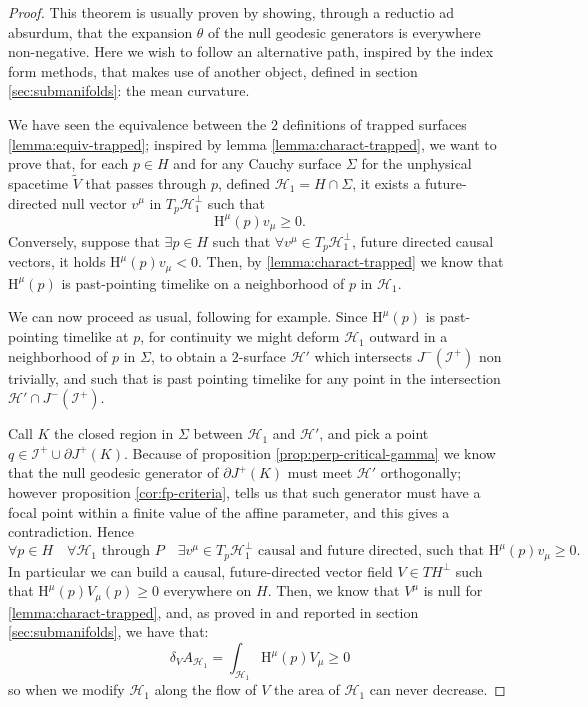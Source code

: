 \begin{proof}
	This theorem is usually proven by showing, through a reductio ad absurdum, that the expansion \(\theta\) of the null geodesic generators is everywhere non-negative. Here we wish to follow an alternative path, inspired by the index form methods, that makes use of another object, defined in section \ref{sec:submanifolds}: the mean curvature.
	
	We have seen the equivalence between the \(2\) definitions of trapped surfaces \ref{lemma:equiv-trapped}; inspired by lemma \ref{lemma:charact-trapped}, we want to prove that, for each \(p \in H\) and for any Cauchy surface \(\Sigma\) for the unphysical spacetime \(\tilde{V}\) that passes through \(p\), defined \(\mathscr{H}_1 = H \cap \Sigma\), it exists a future-directed null vector \(v^{\mu}\) in \(T_p\mathscr{H}_1^{\perp}\) such that
	\[
	\mathrm{H}^{\mu}(p)v_{\mu} \ge 0.
	\]
	Conversely, suppose that \(\exists p\in H\) such that \(\forall v^{\mu} \in T_p\mathscr{H}_1^{\perp}\), future directed causal vectors, it holds \(\mathrm{H}^{\mu}(p)v_{\mu} < 0.\) Then, by \ref{lemma:charact-trapped} we know that \(\mathrm{H}^{\mu}(p)\) is past-pointing timelike on a neighborhood of \(p\) in \(\mathscr{H}_1\).
	
	We can now proceed as usual, following \cite{wald2010general} for example. Since \(\mathrm{H}^{\mu}(p)\) is past-pointing timelike at \(p\), for continuity we might deform \(\mathscr{H}_1\) outward in a neighborhood of \(p\) in \(\Sigma\), to obtain a \(2\)-surface \(\mathscr{H}'\) which intersects \(J^-(\mathscr{I}^+)\) non trivially, and such that is past pointing timelike for any point in the intersection \(\mathscr{H}' \cap J^-(\mathscr{I}^+)\).
	
	Call \(K\) the closed region in \(\Sigma\) between \(\mathscr{H}_1\) and \(\mathscr{H}'\), and pick a point \(q \in \mathscr{I}^+ \cup \partial J^+(K)\). Because of proposition \ref{prop:perp-critical-gamma} we know that the null geodesic generator of \(\partial J^+(K)\) must meet \(\mathscr{H}'\) orthogonally; however proposition \ref{cor:fp-criteria}, tells us that such generator must have a focal point within a finite value of the affine parameter, and this gives a contradiction. Hence 
	\[
	\forall p \in H \quad \forall \mathscr{H}_1 \text{ through } P\quad \exists v^{\mu} \in T_p\mathscr{H}_1^{\perp} \text{ causal and future directed, such that }  \mathrm{H}^{\mu}(p)v_{\mu} \ge 0.
	\]
	In particular we can build a causal, future-directed vector field \(V \in TH^{\perp}\) such that \(\mathrm{H}^{\mu}(p)V_{\mu}(p) \ge 0\) everywhere on \(H\).
	Then, we know that \(V^{\mu}\) is null for \ref{lemma:charact-trapped}, and, as proved in \cite{kriele1999spacetime} and reported in section \ref{sec:submanifolds}, we have that:
	\begin{equation*}
		\delta_VA_{\mathscr{H}_1} = \int_{\mathscr{H}_1} \mathrm{H}^{\mu}(p)V_{\mu} \ge 0
	\end{equation*}
	so when we modify \(\mathscr{H}_1\) along the flow of \(V\) the area of \(\mathscr{H}_1\) can never decrease.
\end{proof}